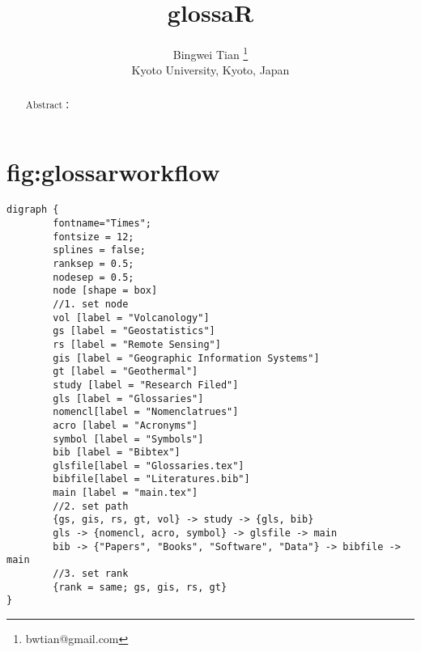 \documentclass[a4paper,times,12pt,listings-bw,microtype]{article}
\author{Bingwei Tian  \thanks{bwtian@gmail.com}\\  \small{Kyoto University, Kyoto, Japan}}
\date{}
\title{glossaR}
\begin{document}
\maketitle
\setcounter{tocdepth}{2}
\tableofcontents

\label{sec-1}
\begin{abstract}
Abstract：
\end{abstract}


\section{fig:glossarworkflow}
\label{sec-2}
\begin{verbatim}
digraph { 
        fontname="Times"; 
        fontsize = 12; 
        splines = false; 
        ranksep = 0.5; 
        nodesep = 0.5; 
        node [shape = box] 
        //1. set node 
        vol [label = "Volcanology"]
        gs [label = "Geostatistics"]
        rs [label = "Remote Sensing"]
        gis [label = "Geographic Information Systems"]
        gt [label = "Geothermal"]
        study [label = "Research Filed"]
        gls [label = "Glossaries"]
        nomencl[label = "Nomenclatrues"]
        acro [label = "Acronyms"]
        symbol [label = "Symbols"]
        bib [label = "Bibtex"]
        glsfile[label = "Glossaries.tex"]
        bibfile[label = "Literatures.bib"]
        main [label = "main.tex"]
        //2. set path 
        {gs, gis, rs, gt, vol} -> study -> {gls, bib}
        gls -> {nomencl, acro, symbol} -> glsfile -> main
        bib -> {"Papers", "Books", "Software", "Data"} -> bibfile -> main
        //3. set rank 
        {rank = same; gs, gis, rs, gt} 
}
\end{verbatim}


\end{document}
